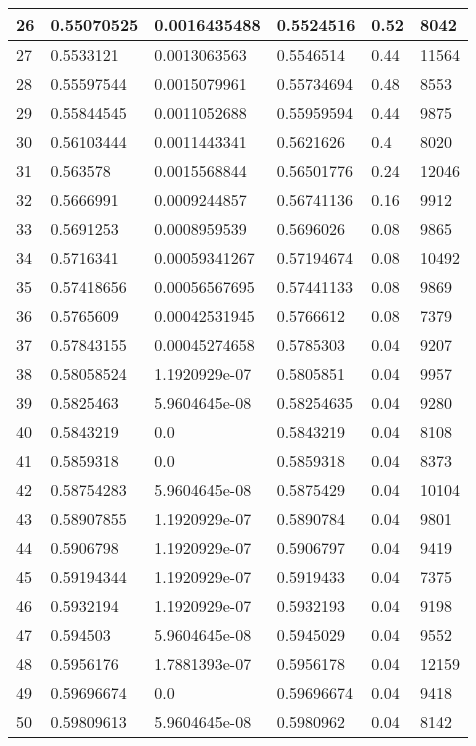 \begin{longtable}{|l|l|l|l|l|l|}
26 & 0.55070525 & 0.0016435488 & 0.5524516 & 0.52 & 8042 \\ \hline 
27 & 0.5533121 & 0.0013063563 & 0.5546514 & 0.44 & 11564 \\ \hline 
28 & 0.55597544 & 0.0015079961 & 0.55734694 & 0.48 & 8553 \\ \hline 
29 & 0.55844545 & 0.0011052688 & 0.55959594 & 0.44 & 9875 \\ \hline 
30 & 0.56103444 & 0.0011443341 & 0.5621626 & 0.4 & 8020 \\ \hline 
31 & 0.563578 & 0.0015568844 & 0.56501776 & 0.24 & 12046 \\ \hline 
32 & 0.5666991 & 0.0009244857 & 0.56741136 & 0.16 & 9912 \\ \hline 
33 & 0.5691253 & 0.0008959539 & 0.5696026 & 0.08 & 9865 \\ \hline 
34 & 0.5716341 & 0.00059341267 & 0.57194674 & 0.08 & 10492 \\ \hline 
35 & 0.57418656 & 0.00056567695 & 0.57441133 & 0.08 & 9869 \\ \hline 
36 & 0.5765609 & 0.00042531945 & 0.5766612 & 0.08 & 7379 \\ \hline 
37 & 0.57843155 & 0.00045274658 & 0.5785303 & 0.04 & 9207 \\ \hline 
38 & 0.58058524 & 1.1920929e-07 & 0.5805851 & 0.04 & 9957 \\ \hline 
39 & 0.5825463 & 5.9604645e-08 & 0.58254635 & 0.04 & 9280 \\ \hline 
40 & 0.5843219 & 0.0 & 0.5843219 & 0.04 & 8108 \\ \hline 
41 & 0.5859318 & 0.0 & 0.5859318 & 0.04 & 8373 \\ \hline 
42 & 0.58754283 & 5.9604645e-08 & 0.5875429 & 0.04 & 10104 \\ \hline 
43 & 0.58907855 & 1.1920929e-07 & 0.5890784 & 0.04 & 9801 \\ \hline 
44 & 0.5906798 & 1.1920929e-07 & 0.5906797 & 0.04 & 9419 \\ \hline 
45 & 0.59194344 & 1.1920929e-07 & 0.5919433 & 0.04 & 7375 \\ \hline 
46 & 0.5932194 & 1.1920929e-07 & 0.5932193 & 0.04 & 9198 \\ \hline 
47 & 0.594503 & 5.9604645e-08 & 0.5945029 & 0.04 & 9552 \\ \hline 
48 & 0.5956176 & 1.7881393e-07 & 0.5956178 & 0.04 & 12159 \\ \hline 
49 & 0.59696674 & 0.0 & 0.59696674 & 0.04 & 9418 \\ \hline 
50 & 0.59809613 & 5.9604645e-08 & 0.5980962 & 0.04 & 8142 \\ \hline 

\end{longtable}

